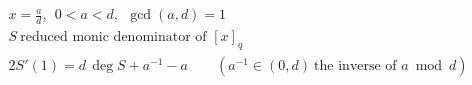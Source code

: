 \documentclass{article}
\begin{document}
\[
\begin{aligned}
&x=\tfrac ad,\ \ 0<a<d,\ \ \gcd(a,d)=1\\
&S\ \text{reduced monic denominator of }[x]_q\\
&2S'(1)=d\,\deg S+a^{-1}-a\qquad(a^{-1}\in(0,d)\ \text{the inverse of }a\bmod d)
\end{aligned}
\]
\end{document}
